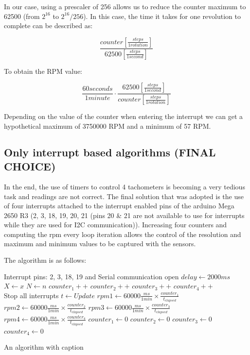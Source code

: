 \documentclass[a4paper]{article}
\begin{document}
In our case, using a prescaler of 256 allows us to reduce the counter maximum to 62500 (from $2^{16}$ to $2^{16}/256$).
In this case, the time it takes for one revolution to complete can be described as:

\begin{equation}
	\frac{counter [\frac{steps}{1rotation}]}{62500 [\frac{steps}{1second}]}
\end{equation} 

To obtain the RPM value:

\begin{equation}
	\frac{60seconds}{1minute}\cdot\frac{62500 [\frac{steps}{1second}]}{counter [\frac{steps}{1rotation}]}
\end{equation}

Depending on the value of the counter when entering the interrupt we can get a hypothetical maximum of 3750000 RPM and a minimum of 57 RPM.

\subsection{Only interrupt based algorithms (FINAL CHOICE)}

In the end, the use of timers to control 4 tachometers is becoming a very tedious task and readings are not correct. The final solution that was adopted is the use of four interrupts attached to the interrupt enabled pins of the arduino Mega 2650 R3 (2, 3, 18, 19, 20, 21 (pins 20 \& 21 are not available to use for interrupts while they are used for I2C communication)). Increasing four counters and computing the rpm every loop iteration allows the control of the resolution and maximum and minimum values to be captured with the sensors.

The algorithm is as follows:

\begin{algorithm}
	\begin{algorithmic}
		\Ensure Interrupt pins: 2, 3, 18, 19 and Serial communication open
		\State $delay \gets 2000ms$
		\State $X \gets x$
		\State $N \gets n$
		\State $counter_1  ++ $
		\State $counter_2  ++ $  
		\State $counter_3  ++ $
		\State $counter_4  ++ $
		\EndFor
		\\Stop all interrupts 
		\State $t \gets Update  $
		\State $rpm1 \gets 60000\frac{ms}{1min} \times \frac{counter_1}{t_{elapsed}} $
		\State $rpm2 \gets 60000\frac{ms}{1min} \times \frac{counter_2}{t_{elapsed}} $
		\State $rpm3 \gets 60000\frac{ms}{1min} \times \frac{counter_3}{t_{elapsed}} $
		\State $rpm4 \gets 60000\frac{ms}{1min} \times \frac{counter_4}{t_{elapsed}} $
		\State $counter_1  \gets 0 $
		\State $counter_2  \gets 0$  
		\State $counter_3  \gets 0 $
		\State $counter_4  \gets 0 $
		\EndWhile
	\end{algorithmic}
\caption{An algorithm with caption}
\label{alg:cap}
\end{algorithm}
\end{document}
